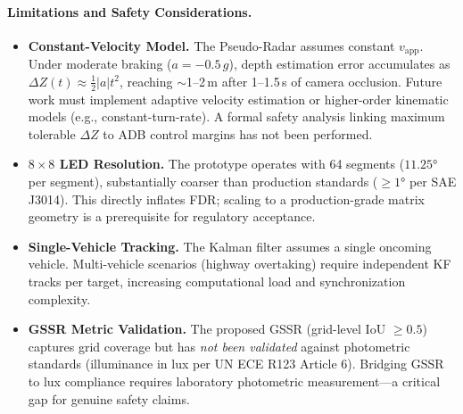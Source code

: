 \documentclass{jstarticle}
\theoremstyle{remark}
\begin{document}
\paragraph{Limitations and Safety Considerations.}
\begin{itemize}[leftmargin=*]
  \item \textbf{Constant-Velocity Model.} The Pseudo-Radar assumes
    constant $v_{\mathrm{app}}$. Under moderate braking
    ($a = -0.5\,g$), depth estimation error accumulates as
    $\Delta Z(t) \approx \frac{1}{2}|a|t^2$, reaching ${\sim}$1--2\,m
    after 1--1.5\,s of camera occlusion. Future work must implement
    adaptive velocity estimation or higher-order kinematic models
    (e.g., constant-turn-rate). A formal safety analysis linking
    maximum tolerable $\Delta Z$ to ADB control margins has not been
    performed.
  \item \textbf{$8\times8$ LED Resolution.} The prototype operates
    with 64 segments ($11.25°$ per segment), substantially coarser
    than production standards ($\geq1°$ per SAE J3014). This directly
    inflates FDR; scaling to a production-grade matrix geometry is a
    prerequisite for regulatory acceptance.
  \item \textbf{Single-Vehicle Tracking.} The Kalman filter assumes
    a single oncoming vehicle. Multi-vehicle scenarios (highway
    overtaking) require independent KF tracks per target, increasing
    computational load and synchronization complexity.
  \item \textbf{GSSR Metric Validation.} The proposed GSSR (grid-level
    IoU $\geq 0.5$) captures grid coverage but has \emph{not been
    validated} against photometric standards (illuminance in lux per
    UN ECE R123 Article 6). Bridging GSSR to lux compliance requires
    laboratory photometric measurement---a critical gap for genuine
    safety claims.
\end{itemize}
\end{document}
